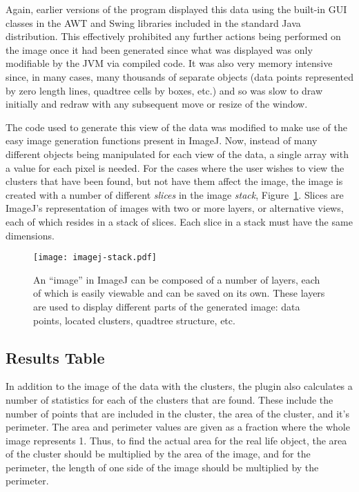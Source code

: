 Again, earlier versions of the program displayed this data using the built-in
GUI classes in the AWT\cite{zukowski1997java} and Swing\cite{loy2002java}
libraries included in the standard Java distribution. This effectively
prohibited any further actions being performed on the image once it had been
generated since what was displayed was only modifiable by the JVM via compiled
code. It was also very memory intensive since, in many cases, many thousands of
separate objects (data points represented by zero length lines, quadtree cells
by boxes, etc.) and so was slow to draw initially and redraw with any
subsequent move or resize of the window.

The code used to generate this view of the data was modified to make use of the
easy image generation functions present in ImageJ. Now, instead of many
different objects being manipulated for each view of the data, a single array
with a value for each pixel is needed. For the cases where the user wishes to
view the clusters that have been found, but not have them affect the image, the
image is created with a number of different \emph{slices} in the image
\emph{stack}, Figure~\ref{fig:imagej-stack}. Slices are ImageJ's representation
of images with two or more layers, or alternative views, each of which resides
in a stack of slices. Each slice in a stack must have the same dimensions.

\begin{figure}[tbhp]
	\centering
	\texttt{[image: imagej-stack.pdf]}

	\caption[Image layers in ImageJ]{An ``image'' in ImageJ can be composed of
		a number of layers, each of which is easily viewable and can be saved
		on its own. These layers are used to display different parts of the
		generated image: data points, located clusters, quadtree structure,
		etc.}\label{fig:imagej-stack}
\end{figure}

\subsection{Results Table}
\label{sub:results_table}

In addition to the image of the data with the clusters, the plugin also
calculates a number of statistics for each of the clusters that are found.
These include the number of points that are included in the cluster, the area
of the cluster, and it's perimeter. The area and perimeter values are given as
a fraction where the whole image represents 1. Thus, to find the actual area
for the real life object, the area of the cluster should be multiplied by the
area of the image, and for the perimeter, the length of one side of the image
should be multiplied by the perimeter.

